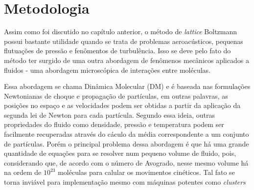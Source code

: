 \chapter{Metodologia}

Assim como foi discutido no capítulo anterior, o método de \textit{lattice} Boltzmann possui bastante utilidade quando se trata de problemas aeroacústicos, pequenas flutuações de pressão e fenômentos de turbulência. Isso se deve pelo fato do método ter surgido de uma outra abordagem de fenômenos mecânicos aplicados a fluidos - uma abordagem microscópica de interações entre moléculas.

Essa abordagem se chama Dinâmica Molecular (DM) e é baseada nas formulações Newtonianas de choque e propagação de partículas, em outras palavras, as posições no espaço e as velocidades podem ser obtidas a partir da aplicação da segunda lei de Newton para cada partícula. Segundo essa ideia, outras propriedades do fluido como densidade, pressão e temperatura podem ser facilmente recuperadas através do cáculo da média correspondente a um conjunto de partículas. Porém o principal problema dessa abordagem é que há uma grande quantidade de equações para se resolver num pequeno volume de fluido, pois, considerando que, de acordo com o número de Avogrado, nesse mesmo volume há na ordem de $10^{23}$ moléculas para calular os movimentos cinéticos. Tal fato se torna inviável para implementação mesmo com máquinas potentes como \textit{clusters}

